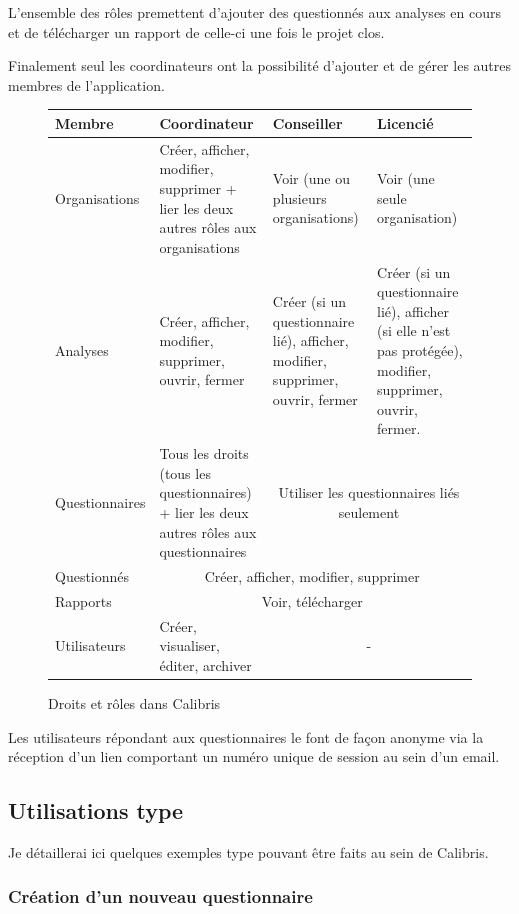 \documentclass[12pt,a4paper]{book}
\newcommand{\otoprule}{\midrule[\heavyrulewidth]}
\begin{document}
L'ensemble des rôles premettent d'ajouter des questionnés aux analyses en cours et de télécharger un rapport de celle-ci une fois le projet clos.

Finalement seul les coordinateurs ont la possibilité d'ajouter et de gérer les autres membres de l'application.

\begin{figure}[h]
   \centering
        \begin{tabular}{p{3cm}p{4cm}p{4cm}p{4cm}}
            \toprule
            Membre & Coordinateur & Conseiller & Licencié
            \tabularnewline\otoprule
            Organisations & Créer, afficher, modifier, supprimer + lier les deux autres rôles aux organisations & Voir (une ou plusieurs organisations) & Voir (une seule organisation)
            \tabularnewline\midrule
            Analyses & Créer, afficher, modifier, supprimer, ouvrir, fermer & Créer (si un questionnaire lié), afficher, modifier, supprimer, ouvrir, fermer & Créer (si un questionnaire lié), afficher (si elle n'est pas protégée), modifier, supprimer, ouvrir, fermer.
            \tabularnewline\midrule
            Questionnaires & Tous les droits (tous les questionnaires) + lier les deux autres rôles aux questionnaires & \multicolumn{2}{c}{Utiliser les questionnaires liés seulement}
            \tabularnewline\midrule
            Questionnés & \multicolumn{3}{c}{Créer, afficher, modifier, supprimer}
            \tabularnewline\midrule\midrule
            Rapports & \multicolumn{3}{c}{Voir, télécharger}
            \tabularnewline\midrule
            Utilisateurs & Créer, visualiser, éditer, archiver & \multicolumn{2}{c}{-}
            \tabularnewline\bottomrule
        \end{tabular}
\caption{Droits et rôles dans Calibris} 
\label{table.droits_calibris}
\end{figure}
  
Les utilisateurs répondant aux questionnaires le font de façon anonyme via la réception d'un lien comportant un numéro unique de session au sein d'un email.

\subsection{Utilisations type}

Je détaillerai ici quelques exemples type pouvant être faits au sein de Calibris.

\subsubsection{Création d'un nouveau questionnaire}
\end{document}
